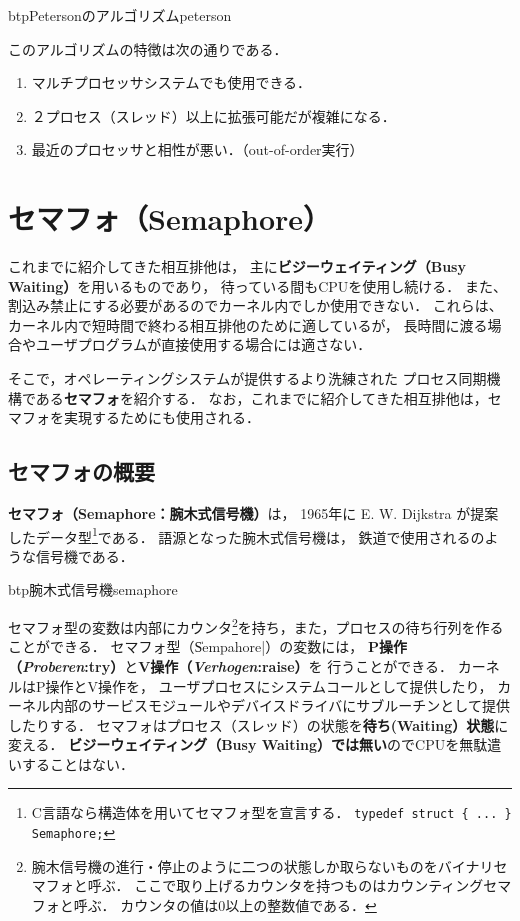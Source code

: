\begin{myfig}{btp}{Petersonのアルゴリズム}{peterson}

\end{myfig}

このアルゴリズムの特徴は次の通りである．

\begin{enumerate}
\item マルチプロセッサシステムでも使用できる．
\item ２プロセス（スレッド）以上に拡張可能だが複雑になる．
\item 最近のプロセッサと相性が悪い．（out-of-order実行）
\end{enumerate}

\section{セマフォ（Semaphore）}
これまでに紹介してきた相互排他は，
主に{\bf ビジーウェイティング（Busy Waiting）}を用いるものであり，
待っている間もCPUを使用し続ける．
また、割込み禁止にする必要があるのでカーネル内でしか使用できない．
これらは、カーネル内で短時間で終わる相互排他のために適しているが，
長時間に渡る場合やユーザプログラムが直接使用する場合には適さない．

そこで，オペレーティングシステムが提供するより洗練された
プロセス同期機構である{\bf セマフォ}を紹介する．
なお，これまでに紹介してきた相互排他は，セマフォを実現するためにも使用される．

\subsection{セマフォの概要}
{\bf セマフォ（Semaphore：腕木式信号機）}は，
1965年に E. W. Dijkstra が提案したデータ型\footnote{
C言語なら構造体を用いてセマフォ型を宣言する．
{\tt typedef struct \{ ... \} Semaphore;}
}である．
語源となった腕木式信号機は，
鉄道で使用されるのような信号機である．

\begin{myfig}{btp}{腕木式信号機}{semaphore}
\end{myfig}

セマフォ型の変数は内部にカウンタ\footnote{
腕木信号機の進行・停止のように二つの状態しか取らないものをバイナリセマフォと呼ぶ．
ここで取り上げるカウンタを持つものはカウンティングセマフォと呼ぶ．
カウンタの値は0以上の整数値である．
}を持ち，また，プロセスの待ち行列を作ることができる．
セマフォ型（\|Sempahore|）の変数には，
{\bf P操作（{\it Proberen}:try）}と{\bf V操作（{\it Verhogen}:raise）}を
行うことができる．
カーネルはP操作とV操作を，
ユーザプロセスにシステムコールとして提供したり，
カーネル内部のサービスモジュールやデバイスドライバにサブルーチンとして提供したりする．
セマフォはプロセス（スレッド）の状態を{\bf 待ち(Waiting）状態}に変える．
{\bf ビジーウェイティング（Busy Waiting）では無い}のでCPUを無駄遣いすることはない．

